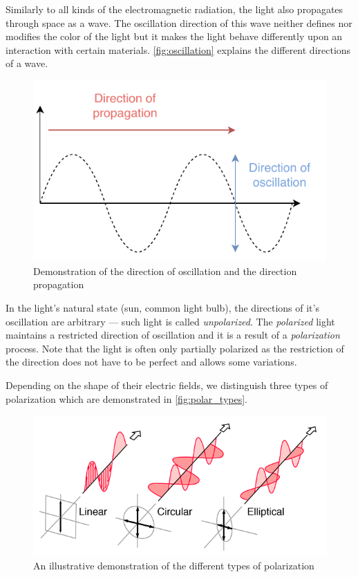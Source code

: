 Similarly to all kinds of the electromagnetic radiation, the light also propagates through space as a wave. The oscillation direction of this wave neither defines nor modifies the color of the light but it makes the light behave differently upon an interaction with certain materials. \autoref{fig:oscillation} explains the different directions of a wave.

\begin{figure}[h]
	\centering
	\includegraphics[width=.6\linewidth]{img/oscillation.pdf}
	\caption{Demonstration of the direction of oscillation and the direction propagation}
	\label{fig:oscillation}
\end{figure}

In the light's natural state (sun, common light bulb), the directions of it's oscillation are arbitrary --- such light is called \emph{unpolarized}. The \emph{polarized} light maintains a restricted direction of oscillation and it is a result of a \emph{polarization} process. Note that the light is often only partially polarized as the restriction of the direction does not have to be perfect and allows some variations.

Depending on the shape of their electric fields, we distinguish three types of polarization which are demonstrated in \autoref{fig:polar_types}.

\begin{figure}[h]
	\centering
	\includegraphics[width=.7\linewidth]{img/polar_types.png}
	\caption[polar types]{An illustrative demonstration of the different types of polarization \footnotemark}
	\label{fig:polar_types}
\end{figure}

